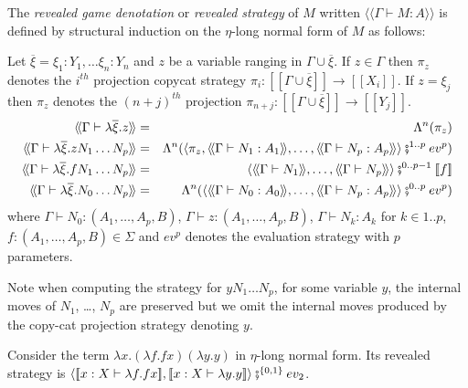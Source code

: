 \documentclass{llncs}
\newcommand{\lsem}{[\![} %
\newcommand{\rsem}{]\!]} %
\newcommand{\sem}[1]{{\lsem #1 \rsem}}
\newcommand{\intersem}[1]{{\langle\!\langle #1 \rangle\!\rangle}}
\newcommand\union{\cup}
\begin{document}
\begin{definition}
\label{dfn:interactionstrategy_ofterms}
The \emph{revealed game denotation} or \emph{revealed
strategy} of $M$ written $\intersem{\Gamma \vdash M : A}$ is defined by structural induction on the $\eta$-long normal form of $M$ as follows:

Let $\overline{\xi} = \xi_1 : Y_1, \ldots \xi_n : Y_n$
and $z$ be a variable ranging in $\Gamma \union \overline{\xi}$. If $z\in \Gamma$ then $\pi_{z}$ denotes
the $i^{th}$ projection copycat strategy $\pi_i : \sem{\Gamma \union \overline{\xi}} \rightarrow \sem{X_i}$. If $z = \xi_j$ then
$\pi_{z}$ denotes the $(n+j)^{th}$ projection $\pi_{n+j} : \sem{\Gamma \union \overline{\xi}} \rightarrow \sem{Y_j}$.
\begin{eqnarray*}
\intersem{\Gamma \vdash \lambda \overline{\xi} . z } &=& \Lambda^n(\pi_{z})  \\
\intersem{\Gamma \vdash \lambda \overline{\xi} . z N_1 \ldots N_p} &=& \Lambda^n(\langle \pi_z, \intersem{\Gamma \vdash N_1 : A_1}, \ldots, \intersem{\Gamma \vdash N_p : A_p}  \rangle \fatsemi ^{1..p} ev^p) \\
\intersem{\Gamma \vdash \lambda \overline{\xi}. f N_1 \ldots N_p} &=& \langle \intersem{\Gamma \vdash N_1}, \ldots, \intersem{\Gamma \vdash N_p} \rangle \fatsemi^{0..p-1} \sem{f} \\
\intersem{\Gamma \vdash \lambda \overline{\xi} . N_0 \ldots N_p} &=& \Lambda^n(\langle \intersem{\Gamma \vdash N_0 : A_0}, \ldots, \intersem{\Gamma \vdash N_p : A_p}  \rangle \fatsemi^{0..p} ev^p)
\end{eqnarray*}
where $\Gamma \vdash N_0 : (A_1,\ldots,A_p,B)$, $\Gamma \vdash z : (A_1,\ldots,A_p,B)$, $\Gamma \vdash N_k : A_k$ for $k\in 1..p$,
$f : (A_1,\ldots,A_p,B) \in \Sigma$ and $ev^p$ denotes the evaluation strategy with $p$ parameters.
\end{definition}
Note  when computing the strategy for $y N_1 \ldots N_p$, for some variable $y$, the internal moves of $N_1$, \ldots, $N_p$ are preserved but
we omit the internal moves produced by the copy-cat projection strategy denoting $y$.



\begin{example}
Consider the term $\lambda x . (\lambda f . f x) (\lambda y . y)$ in $\eta$-long normal form.
Its revealed strategy is $\langle \sem{ x:X \vdash \lambda f . f
x} , \sem{ x:X \vdash \lambda y . y} \rangle \fatsemi^{\{0,1\}} ev_2$.
\end{example}
\end{document}
